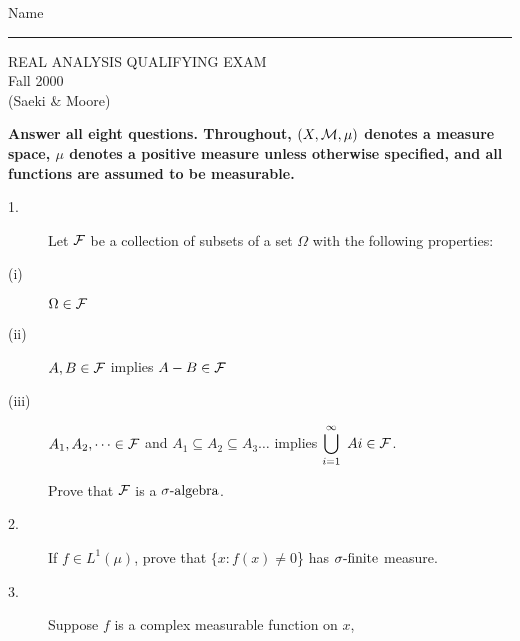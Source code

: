\documentclass[bbb]{report}
\def\ds{\displaystyle}
\def\F{{\cal F}}
\begin{document}
\begin{large}

\hfill Name \rule{2.5in}{.01in}
\par
\vspace{.15in}

\begin{center}
   REAL ANALYSIS QUALIFYING EXAM \\
  Fall 2000\\
   (Saeki \& Moore) \\
\end{center}


\vspace{.1in}


\begin{large}
{\bf Answer all eight questions.
Throughout, $(X, {\cal M} ,\mu)$ denotes a measure space,
$\mu$ denotes a positive measure unless otherwise specified, and all
functions are assumed to be measurable.}
\end{large}

\vspace{.1in}

\renewcommand\baselinestretch{1.25}

\begin{description}

\item[1.]
Let $\F$ be a collection of subsets of a set $\Omega$ with the following
properties:

\item[\quad (i)]
$\Omega\in \F$

\item[\quad (ii)]
$A,B\in\F$ implies $A-B\in\F$

\item[\quad (iii)]
$A_1,A_2,\dots\in\F$ and $A_1\subseteq A_2\subseteq A_3\dots$
implies $\ds\bigcup^\infty_{i=1}\ Ai\in\F$.

Prove that $\F$ is a $\sigma\hbox{-algebra}$.

\vspace{.05in}

\item[2.]
If $f\in L^1(\mu)$, prove that $\{x: f(x)\not= 0$\}
has $\sigma\hbox{-finite}$ measure.


\vspace{.05in}

\item[3.]
Suppose $f$ is a complex measurable function on $x$,


\end{description}
\end{large}
\end{document}
